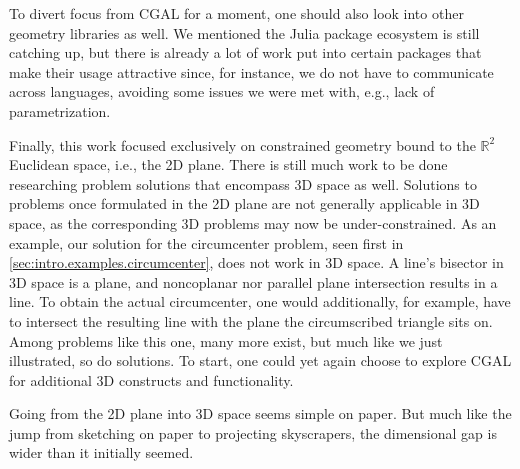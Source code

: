 To divert focus from \ac{CGAL} for a moment, one should also look into other
geometry libraries as well.  We mentioned the Julia package ecosystem is still
catching up, but there is already a lot of work put into certain packages that
make their usage attractive since, for instance, we do not have to communicate
across languages, avoiding some issues we were met with, e.g., lack of
parametrization.

Finally, this work focused exclusively on constrained geometry bound to the
$\mathbb{R}^2$ Euclidean space, i.e., the 2D plane.  There is still much work to
be done researching problem solutions that encompass 3D space as well.
Solutions to problems once formulated in the 2D plane are not generally
applicable in 3D space, as the corresponding 3D problems may now be
under-constrained.  As an example, our solution for the circumcenter problem,
seen first in \cref{sec:intro.examples.circumcenter}, does not work in 3D space.
A line's bisector in 3D space is a plane, and noncoplanar nor parallel plane
intersection results in a line.  To obtain the actual circumcenter, one would
additionally, for example, have to intersect the resulting line with the plane
the circumscribed triangle sits on.  Among problems like this one, many more
exist, but much like we just illustrated, so do solutions.  To start, one could
yet again choose to explore \ac{CGAL} for additional 3D constructs and
functionality.

Going from the 2D plane into 3D space seems simple on paper.  But much like the
jump from sketching on paper to projecting skyscrapers, the dimensional gap is
wider than it initially seemed.
